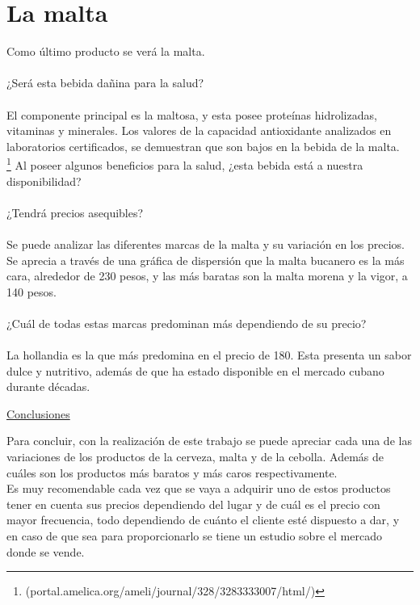 \documentclass{article}
\begin{document}
    \part*{La malta}
    Como último producto se verá la malta.\\
    \\
    ¿Será esta bebida dañina para la salud?\\
    \\
    El componente principal es la maltosa, y esta posee proteínas hidrolizadas, vitaminas y minerales. Los valores de la capacidad antioxidante analizados en laboratorios certificados, se demuestran que son bajos en la bebida de la malta. \\
    \footnote{(portal.amelica.org/ameli/journal/328/3283333007/html/)}
    Al poseer algunos beneficios para la salud, ¿esta bebida está a nuestra disponibilidad?\\
    \\
    ¿Tendrá precios asequibles?\\
    \\
    Se puede analizar las diferentes marcas de la malta y su variación en los precios. Se aprecia a través de una gráfica de dispersión que la malta bucanero es la más cara, alrededor de 230 pesos, y las más baratas son la malta morena y la vigor, a 140 pesos.\\
    \\
    ¿Cuál de todas estas marcas predominan más dependiendo de su precio?\\
    \\
    La hollandia es la que más predomina en el precio de 180. Esta presenta un sabor dulce y nutritivo, además de que ha estado disponible en el mercado cubano durante décadas.\\

    \newpage
    \begin{center}
        {\underline{\large{Conclusiones}}}\\
    \end{center}
    Para concluir, con la realización de este trabajo se puede apreciar cada una de las variaciones de los productos de la cerveza, malta y de la cebolla. Además de cuáles son los productos más baratos y más caros respectivamente.\\
    Es muy recomendable cada vez que se vaya a adquirir uno de estos productos tener en cuenta sus precios dependiendo del lugar y de cuál es el precio con mayor frecuencia, todo dependiendo de cuánto el cliente esté dispuesto a dar, y en caso de que sea para proporcionarlo se tiene un estudio sobre el mercado donde se vende. 



    
\end{document}

